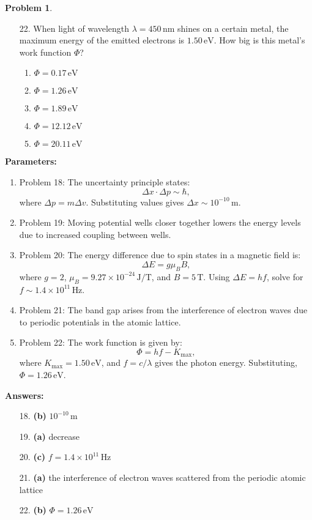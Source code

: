 \documentclass[12pt]{article}
\theoremstyle{definition} %
\newtheorem{problem}{Problem}
\theoremstyle{plain} %
\begin{document}
\begin{problem}
\begin{enumerate}
        \item[22.] When light of wavelength \(\lambda = 450 \, \text{nm}\) shines on a certain metal, the maximum energy of the emitted electrons is \(1.50 \, \text{eV}\). How big is this metal’s work function \(\Phi\)?
        \begin{enumerate}
            \item \(\Phi = 0.17 \, \text{eV}\)
            \item \textbf{\(\Phi = 1.26 \, \text{eV}\)}
            \item \(\Phi = 1.89 \, \text{eV}\)
            \item \(\Phi = 12.12 \, \text{eV}\)
            \item \(\Phi = 20.11 \, \text{eV}\)
        \end{enumerate}
    \end{enumerate}
    
    \textbf{Parameters:}
    \begin{enumerate}
        \item Problem 18: The uncertainty principle states:
        $$
        \Delta x \cdot \Delta p \sim \hbar,
        $$
        where \(\Delta p = m \Delta v\). Substituting values gives \(\Delta x \sim 10^{-10} \, \text{m}\).
        \item Problem 19: Moving potential wells closer together lowers the energy levels due to increased coupling between wells.
        \item Problem 20: The energy difference due to spin states in a magnetic field is:
        $$
        \Delta E = g \mu_B B,
        $$
        where \(g = 2\), \(\mu_B = 9.27 \times 10^{-24} \, \text{J/T}\), and \(B = 5 \, \text{T}\). Using \(\Delta E = h f\), solve for \(f \sim 1.4 \times 10^{11} \, \text{Hz}\).
        \item Problem 21: The band gap arises from the interference of electron waves due to periodic potentials in the atomic lattice.
        \item Problem 22: The work function is given by:
        $$
        \Phi = h f - K_{\text{max}},
        $$
        where \(K_{\text{max}} = 1.50 \, \text{eV}\), and \(f = c / \lambda\) gives the photon energy. Substituting, \(\Phi = 1.26 \, \text{eV}\).
    \end{enumerate}
    
    \textbf{Answers:}
    \begin{enumerate}
        \item[18.] \textbf{(b)} \(10^{-10} \, \text{m}\)
        \item[19.] \textbf{(a)} decrease
        \item[20.] \textbf{(c)} \(f = 1.4 \times 10^{11} \, \text{Hz}\)
        \item[21.] \textbf{(a)} the interference of electron waves scattered from the periodic atomic lattice
        \item[22.] \textbf{(b)} \(\Phi = 1.26 \, \text{eV}\)
    \end{enumerate}
\end{problem}
\end{document}
